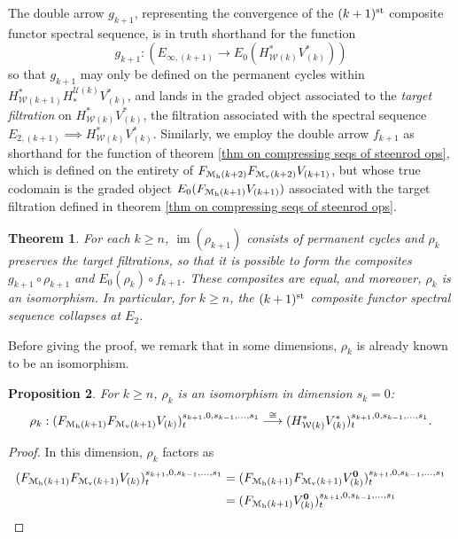 \documentclass[11pt]{amsart}
\theoremstyle{plain}
\newtheorem{thm}{Theorem}[section]
\newtheorem{prop}[thm]{Proposition}
\theoremstyle{definition}
\DeclareMathOperator{\im}{im}
\renewcommand{\to}{\longrightarrow}
\newcommand{\calW}{\mathcal{W}}
\newcommand{\calU}{\mathcal{U}}
\newcommand{\calM}{\mathcal{M}}
\theoremstyle{plain}
\begin{document}
\begin{Calculations of HWn for n nonzero}
The double arrow $g_{k+1}$, representing the convergence of the $(k+1)^{\textup{st}}$ composite functor spectral sequence, is in truth shorthand for the function
\[g_{k+1}:\left(E_{\infty,(k+1)}\to E_0(H_{\calW(k)}^{*}V^{*}_{(k)})\right)\]
so that $g_{k+1}$ may only be defined on the permanent cycles within $H^*_{\calW(k+1)}H_*^{\calU(k)}V^*_{(k)}$, and lands in the graded object associated to the \emph{target filtration} on $H_{\calW(k)}^{*}V^{*}_{(k)}$, the filtration associated with the spectral sequence $E_{2,(k+1)}\implies H_{\calW(k)}^{*}V^{*}_{(k)}$. Similarly, we employ the double arrow $f_{k+1}$ as shorthand for the function of theorem \ref{thm on compressing seqs of steenrod ops}, which is defined on the entirety of $F_{\calM_{\textup{h}}(k+2)}F_{\calM_{\textup{v}}(k+2)}V_{(k+1)}$, but whose true codomain is the graded object $E_0(F_{\calM_\textup{h}(k+1)}V_{(k+1)})$ associated with the target filtration defined in theorem \ref{thm on compressing seqs of steenrod ops}.
\begin{thm}\label{thm on collapsing of most sseqs}
For each $k\geq n$, $\im(\rho_{k+1})$ consists of permanent cycles and $\rho_k$ preserves the target filtrations, so that it is possible to form the composites $g_{k+1}\circ \rho_{k+1}$ and $E_0(\rho_{k})\circ f_{k+1}$. These composites are equal, and moreover, $\rho_k$ is an isomorphism. In particular, for $k\geq n$, the  $(k+1)^{\textup{st}}$ composite functor spectral sequence collapses at $E_2$.
\end{thm}
Before giving the proof, we remark that in some dimensions, $\rho_k$ is already known to be an isomorphism.
\begin{prop}\label{isomorphism rho k in some dims}
For $k\geq n$, $\rho_k$ is an isomorphism in dimension $s_k=0$:
\[\rho_k:(F_{\calM_{\textup{h}}(k+1)}F_{\calM_{\textup{v}}(k+1)}V_{(k)})^{s_{k+1},0,s_{k-1},\ldots,s_1}_{t} \overset{\cong}{\to}(H_{\calW(k)}^{*}V^{*}_{(k)})^{s_{k+1},0,s_{k-1},\ldots,s_1}_{t}.\]
\end{prop}
\begin{proof}
In this dimension, $\rho_k$ factors as
\begin{alignat*}{2}
(F_{\calM_{\textup{h}}(k+1)}F_{\calM_{\textup{v}}(k+1)}V_{(k)})^{s_{k+1},0,s_{k-1},\ldots,s_1}_{t}
&=
(F_{\calM_{\textup{h}}(k+1)}F_{\calM_{\textup{v}}(k+1)}V_{(k)}^{\textbf{\textup{0}}})^{s_{k+1},0,s_{k-1},\ldots,s_1}_{t}\\
&=(F_{\calM_{\textup{h}}(k+1)}V_{(k)}^{\textbf{\textup{0}}})^{s_{k+1},0,s_{k-1},\ldots,s_1}_{t}\\

\end{alignat*}
\end{proof}
\end{Calculations of HWn for n nonzero}
\end{document}

